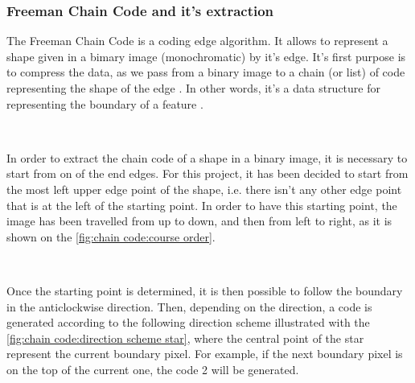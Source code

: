 



\subsubsection{Freeman Chain Code and it's extraction}


The Freeman Chain Code is a coding edge algorithm. It allows to represent a shape given in a bimary image (monochromatic) by it's edge. It's first purpose is to compress the data, as we pass from a binary image to a chain (or list) of code representing the shape of the edge \cite{bib:chain:ParametreGeometriqueChaineFreeman}. In other words, it's a data structure for representing the boundary of a feature \cite{bib:chain:DigitalImageProcessing}.

~~

In order to extract the chain code of a shape in a binary image, it is necessary to start from on of the end edges. For this project, it has been decided to start from the most left upper edge point of the shape, i.e. there isn't any other edge point that is at the left of the starting point. In order to have this starting point, the image has been travelled from up to down, and then from left to right, as it is shown on the \vref{fig:chain code:course order}.


~~


Once the starting point is determined, it is then possible to follow the boundary in the anticlockwise direction. Then, depending on the direction, a code is generated according to the following direction scheme illustrated with the \vref{fig:chain code:direction scheme star}, where the central point of the star represent the current boundary pixel. For example, if the next boundary pixel is on the top of the current one, the code 2 will be generated. 


